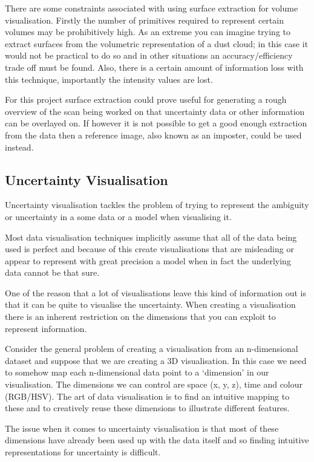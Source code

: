 \documentclass[
  oneside,
  11pt, a4paper,
  footinclude=true,
  headinclude=true,
  cleardoublepage=empty
]{scrbook}
\begin{document}
There are some constraints associated with using surface extraction for volume visualisation. Firstly the number of primitives required to represent certain volumes may be prohibitively high. As an extreme you can imagine trying to extract surfaces from the volumetric representation of a dust cloud; in this case it would not be practical to do so and in other situations an accuracy/efficiency trade off must be found. Also, there is a certain amount of information loss with this technique, importantly the intensity values are lost.

For this project surface extraction could prove useful for generating a rough overview of the scan being worked on that uncertainty data or other information can be overlayed on. If however it is not possible to get a good enough extraction from the data then a reference image, also known as an imposter, could be used instead.

\newpage
\subsection{Uncertainty Visualisation}
Uncertainty visualisation tackles the problem of trying to represent the ambiguity or uncertainty in a some data or a model when visualising it.

Most data visualisation techniques implicitly assume that all of the data being used is perfect and because of this create visualisations that are misleading or appear to represent with great precision a model when in fact the underlying data cannot be that sure.

One of the reason that a lot of visualisations leave this kind of information out is that it can be quite to visualise the uncertainty. When creating a visualisation there is an inherent restriction on the dimensions that you can exploit to represent information.

Consider the general problem of creating a visualisation from an n-dimensional dataset and suppose that we are creating a 3D visualisation. In this case we need to somehow map each n-dimensional data point to a ‘dimension’ in our visualisation. The dimensions we can control are space (x, y, z), time and colour (RGB/HSV). The art of data visualisation is to find an intuitive mapping to these and to creatively reuse these dimensions to illustrate different features.

The issue when it comes to uncertainty visualisation is that most of these dimensions have already been used up with the data itself and so finding intuitive representations for uncertainty is difficult.
\end{document}
